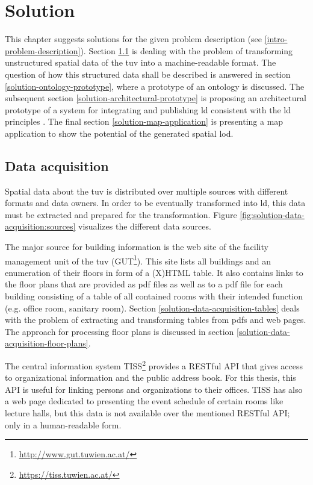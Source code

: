 \documentclass[draft,final]{vutinfth} %
\begin{document}
\chapter{Solution}
\label{solution-chapter}

This chapter suggests solutions for the given problem description (see \ref{intro-problem-description}). Section \ref{solution-data-acquisition} is dealing with the problem of transforming unstructured spatial data of the \gls{tuv} into a machine-readable format. The question of how this structured data shall be described is answered in section \ref{solution-ontology-prototype}, where a prototype of an ontology is discussed. The subsequent section \ref{solution-architectural-prototype} is proposing an architectural prototype of a system for integrating and publishing \gls{ld} consistent with the \gls{ld} principles \cite{berners-lee_linked_2009}. The final section \ref{solution-map-application} is presenting a map application to show the potential of the generated spatial \gls{lod}.

\section{Data acquisition}
\label{solution-data-acquisition}
Spatial data about the \gls{tuv} is distributed over multiple sources with different formats and data owners. In order to be eventually transformed into \gls{ld}, this data must be extracted and prepared for the transformation. Figure \ref{fig:solution-data-acquisition:sources} visualizes the different data sources.

The major source for building information is the web site of the facility management unit of the \gls{tuv} (GUT\footnote{\url{http://www.gut.tuwien.ac.at/}}). This site lists all buildings and an enumeration of their floors in form of a (X)HTML table. It also contains links to the floor plans that are provided as \gls{pdf} files as well as to a \gls{pdf} file for each building consisting of a table of all contained rooms with their intended function (e.g. office room, sanitary room). Section \ref{solution-data-acquisition-tables} deals with the problem of extracting and transforming tables from \gls{pdf}s and web pages. The approach for processing floor plans is discussed in section \ref{solution-data-acquisition-floor-plans}.


The central information system TISS\footnote{\url{https://tiss.tuwien.ac.at/}} provides a RESTful API that gives access to organizational information and the public address book. For this thesis, this API is useful for linking persons and organizations to their offices. TISS has also a web page dedicated to presenting the event schedule of certain rooms like lecture halls, but this data is not available over the mentioned RESTful API; only in a human-readable form.
\end{document}
